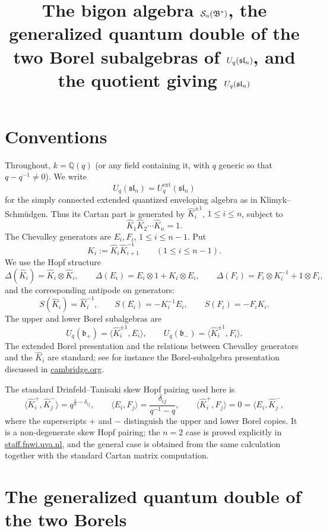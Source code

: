 \documentclass[11pt]{article}
\title{The bigon algebra \(\mathcal S_n(\mathfrak B^*)\), the generalized quantum double of the two Borel subalgebras of \(U_q(\sln)\), and the quotient giving \(U_q(\sln)\)}
\author{}
\date{}
\newcommand{\fb}{\mathfrak b}
\newcommand{\sln}{\mathfrak{sl}_n}
\newcommand{\la}{\langle}
\newcommand{\ra}{\rangle}
\newcommand{\Khat}{\widehat K}
\begin{document}
\maketitle

\section*{Conventions}
Throughout, \(k=\mathbb Q(q)\) (or any field containing it, with \(q\) generic so that \(q-q^{-1}\neq 0\)).  We write
\[
U_q(\sln)=U_q^{\mathrm{ext}}(\sln)
\]
for the simply connected extended quantized enveloping algebra as in Klimyk--Schm\"udgen.  Thus its Cartan part is generated by \(\Khat_i^{\pm1}\), \(1\le i\le n\), subject to
\[
\Khat_1\Khat_2\cdots \Khat_n=1.
\]
The Chevalley generators are \(E_i,F_i\), \(1\le i\le n-1\).  Put
\[
K_i:=\Khat_i\Khat_{i+1}^{-1}\qquad(1\le i\le n-1).
\]
We use the Hopf structure
\[
\Delta(\Khat_i)=\Khat_i\otimes\Khat_i,\qquad
\Delta(E_i)=E_i\otimes 1+K_i\otimes E_i,\qquad
\Delta(F_i)=F_i\otimes K_i^{-1}+1\otimes F_i,
\]
and the corresponding antipode on generators:
\[
S(\Khat_i)=\Khat_i^{-1},\qquad S(E_i)=-K_i^{-1}E_i,\qquad S(F_i)=-F_iK_i.
\]
The upper and lower Borel subalgebras are
\[
U_q(\fb_+)=\langle \Khat_i^{\pm1},E_i\rangle,\qquad
U_q(\fb_-)=\langle \Khat_i^{\pm1},F_i\rangle .
\]
The extended Borel presentation and the relations between Chevalley generators and the \(\Khat_i\) are standard; see for instance the Borel-subalgebra presentation discussed in
\href{https://www.cambridge.org/core/services/aop-cambridge-core/content/view/886B0B4D8E3D242A51A0380A486351EA/S0013091504000689a.pdf/presentation-by-borel-subalgebras-and-chevalley-generators-for-quantum-enveloping-algebras.pdf}{cambridge.org}.

The standard Drinfeld--Tanisaki skew Hopf pairing used here is
\[
\la \Khat_i^+,\Khat_j^-\ra=q^{\frac1n-\delta_{ij}},\qquad
\la E_i,F_j\ra=\frac{\delta_{ij}}{q^{-1}-q},\qquad
\la \Khat_i^+,F_j\ra=0=\la E_i,\Khat_j^-,
\]
where the superscripts \(+\) and \(-\) distinguish the upper and lower Borel copies.  It is a non-degenerate skew Hopf pairing; the \(n=2\) case is proved explicitly in
\href{https://staff.fnwi.uva.nl/j.v.stokman/Quantumsl2.pdf}{staff.fnwi.uva.nl}, and the general case is obtained from the same calculation together with the standard Cartan matrix computation.

\section{The generalized quantum double of the two Borels}
\end{document}
